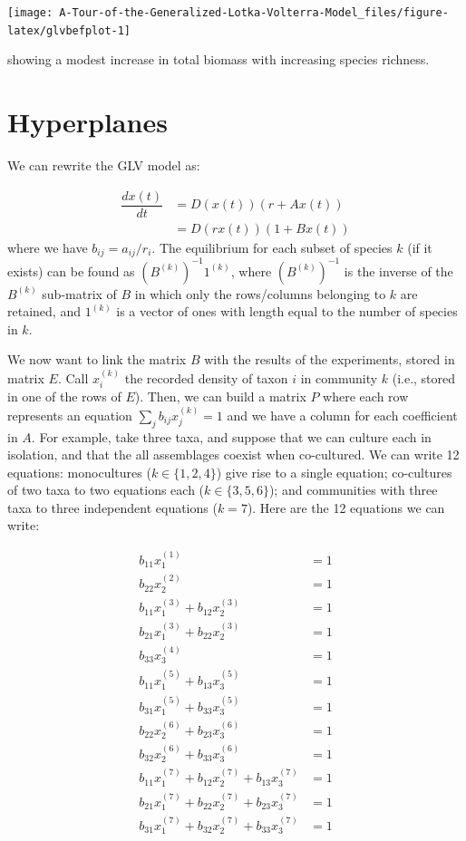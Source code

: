 \documentclass[]{book}
\begin{document}
\begin{center}\texttt{[image: A-Tour-of-the-Generalized-Lotka-Volterra-Model\_files/figure-latex/glvbefplot-1]} \end{center}

showing a modest increase in total biomass with increasing species richness.

\hypertarget{hyperplanes}{%
\section{Hyperplanes}\label{hyperplanes}}

We can rewrite the GLV model as:

\[
\begin{aligned}
\dfrac{dx(t)}{dt} &= D(x(t))(r + A x(t))\\
&= D(r x(t))(1 + B x(t))
\end{aligned}
\]
where we have \(b_{ij} = a_{ij} / r_i\). The equilibrium for each subset of species \(k\) (if it exists) can be found as \((B^{(k)})^{-1} 1^{(k)}\), where \((B^{(k)})^{-1}\) is the inverse of the \(B^{(k)}\) sub-matrix of \(B\) in which only the rows/columns belonging to \(k\) are retained, and \(1^{(k)}\) is a vector of ones with length equal to the number of species in \(k\).

We now want to link the matrix \(B\) with the results of the experiments, stored in matrix \(E\). Call \(x^{(k)}_i\) the recorded density of taxon \(i\) in community \(k\) (i.e., stored in one of the rows of \(E\)). Then, we can build a matrix \(P\) where each row represents an equation \(\sum_j b_{ij} x_j^{(k)} = 1\) and we have a column for each coefficient in \(A\). For example, take three taxa, and suppose that we can culture each in isolation, and that the all assemblages coexist when co-cultured. We can write 12 equations: monocultures (\(k \in \{1, 2, 4\}\)) give rise to a single equation; co-cultures of two taxa to two equations each (\(k \in \{3, 5, 6 \}\)); and communities with three taxa to three independent equations (\(k = 7\)). Here are the 12 equations we can write:

\[
\begin{aligned}
b_{11} x_1^{(1)} &= 1\\
b_{22} x_2^{(2)} &= 1\\
b_{11} x_1^{(3)} + b_{12}x_2^{(3)} &= 1\\
b_{21} x_1^{(3)} + b_{22}x_2^{(3)} &= 1\\
b_{33} x_3^{(4)} &= 1\\
b_{11} x_1^{(5)} + b_{13} x_3^{(5)} &= 1\\
b_{31} x_1^{(5)} + b_{33} x_3^{(5)} &= 1\\
b_{22} x_2^{(6)} + b_{23} x_3^{(6)} &= 1\\
b_{32} x_2^{(6)} + b_{33} x_3^{(6)} &= 1\\
b_{11} x_1^{(7)} + b_{12} x_2^{(7)} + b_{13} x_3^{(7)} & = 1\\
b_{21} x_1^{(7)} + b_{22} x_2^{(7)} + b_{23} x_3^{(7)} & = 1\\
b_{31} x_1^{(7)} + b_{32} x_2^{(7)} + b_{33} x_3^{(7)} & = 1
\end{aligned}
\]
\end{document}
